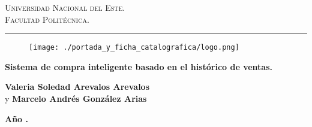 \documentclass[12pt,a4paper,oneside]{book}
\begin{document}
\renewcommand{\glossaryname}{Glosario}

\renewcommand\listtablename{\'Indice de Tablas}

\renewcommand{\tablename}{Tabla}
\renewcommand{\acronymname}{Acr\'onimos y s\'imbolos}
\renewcommand{\bibname}{Referencias bibliogr\'aficas}
\frontmatter
\vspace*{-3cm}

\thispagestyle{empty}

{\bf
\begin{center}
\large
\vspace*{-1 cm}\Large \textsc{Universidad Nacional del Este.} \\
\Large \textsc{Facultad Politécnica.} \\
\vspace*{0.5 cm}\hrule
\end{center}
}

\vspace*{-0.5 cm}
\begin{figure}[htb]
\begin{center}
\texttt{[image: ./portada\_y\_ficha\_catalografica/logo.png]}

\end{center}
\end{figure}


\vspace{3 cm}
{
\noindent
\begin{center}
    
\huge \bf Sistema de compra inteligente basado en el histórico de ventas.
\end{center}
}


\vspace{6 cm}

\begin{center}
{\textbf{\Large Valeria Soledad Arevalos Arevalos}\\[5mm]
\hspace{0.5 cm} y \textbf{\Large Marcelo Andrés González Arias}
\vspace{0.5cm}

\textbf{Año \the\year.}}
\end{center}









\tableofcontents
\listoffigures
{}
\listoftables
{}
\printglossary[type=\acronymtype] %
{}
\mainmatter



%
%
\end{document}
